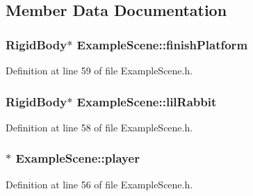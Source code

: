 \subsection{Member Data Documentation}
\subsubsection[{\texorpdfstring{finish\+Platform}{finishPlatform}}]{\setlength{\rightskip}{0pt plus 5cm}Rigid\+Body$\ast$ Example\+Scene\+::finish\+Platform\hspace{0.3cm}{\ttfamily [private]}}\hypertarget{class_example_scene_afbff0ff25c73017d1900527e7c8b3588}{}\label{class_example_scene_afbff0ff25c73017d1900527e7c8b3588}


Definition at line 59 of file Example\+Scene.\+h.

\subsubsection[{\texorpdfstring{lil\+Rabbit}{lilRabbit}}]{\setlength{\rightskip}{0pt plus 5cm}Rigid\+Body$\ast$ Example\+Scene\+::lil\+Rabbit\hspace{0.3cm}{\ttfamily [private]}}\hypertarget{class_example_scene_a5c3d5896fb864c2005e71dde8e5b2591}{}\label{class_example_scene_a5c3d5896fb864c2005e71dde8e5b2591}


Definition at line 58 of file Example\+Scene.\+h.

\subsubsection[{\texorpdfstring{player}{player}}]{$\ast$ Example\+Scene\+::player\hspace{0.3cm}{\ttfamily [private]}}\hypertarget{class_example_scene_ae2bcd80d4ffd43714565e42129dc624b}{}\label{class_example_scene_ae2bcd80d4ffd43714565e42129dc624b}


Definition at line 56 of file Example\+Scene.\+h.

